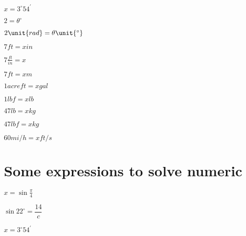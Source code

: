 \documentclass{article}
\begin{document}
$x=3^{\circ }54^{\prime }$

$2=\theta ^{\circ }$

$2\unit{rad}=\theta \unit{%
{{}^\circ}%
}$

$7\unit{ft}=x\unit{in}$

$7\frac{\unit{ft}}{\unit{in}}=x$

$7\unit{ft}=x\unit{m}$

$1\unit{acre}\unit{ft}=x\unit{gal}$

$1\unit{lbf}=x\unit{lb}$

$47\unit{lb}=x\unit{kg}$

$47\unit{lbf}=x\unit{kg}$

$60\unit{mi}/\unit{h}=x\unit{ft}/\unit{s}$

\section{Some expressions to solve numeric}

$x=\sin \frac{\pi }{4}$

$\sin 22^{\circ }=\dfrac{14}{c}$

$x=3^{\circ }54^{\prime }$
\end{document}
